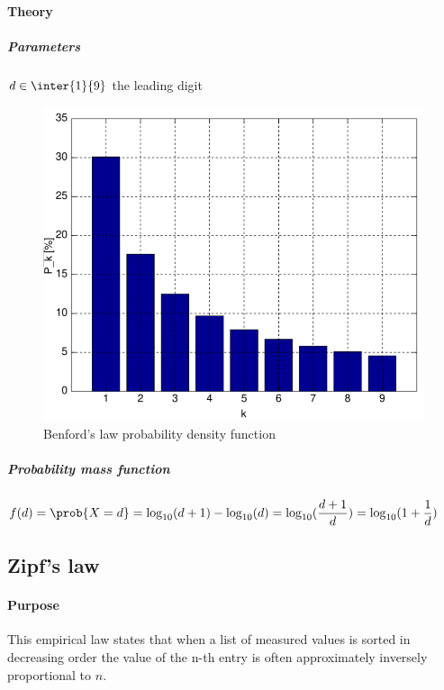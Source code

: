 \paragraph{Theory}
\subparagraph{Parameters}
$d\in\inter{1}{9}$ the leading digit
\begin{figure}[H]
    \begin{center}
        \includegraphics[width=.5\textwidth]{./chapters/2_statistics/02_common_probability_distributions/images/04_benford_law.png}
    \end{center}
    \caption{Benford's law probability density function}
    \label{fig:04_benford_law}
\end{figure}
\subparagraph{Probability mass function}
$f(d) = \prob{X=d} = \displaystyle\log_{10}(d+1) - \displaystyle\log_{10}(d) = 
\displaystyle\log_{10}(\frac{d + 1}{d}) = \displaystyle\log_{10}(1 + \frac{1}{d})$
\subsection{Zipf's law}
\paragraph{Purpose}
This empirical law states that when a list of measured values is sorted in decreasing order the value
of the n-th entry is often approximately inversely proportional to $n$.

